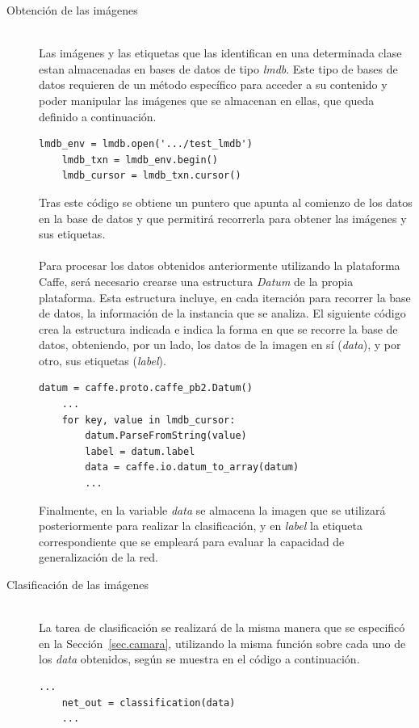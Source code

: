 \begin{description}
	\item[Obtención de las imágenes] \hfill 
	\vspace{5pt}
	\\
	Las imágenes y las etiquetas que las identifican en una determinada clase estan almacenadas en bases de datos de tipo \textit{\acrfull{lmdb}}. Este tipo de bases de datos requieren de un método específico para acceder a su contenido y poder manipular las imágenes que se almacenan en ellas, que queda definido a continuación.
	\vspace{10pt}
	\begin{lstlisting}[frame=single]
	lmdb_env = lmdb.open('.../test_lmdb')
	lmdb_txn = lmdb_env.begin()
	lmdb_cursor = lmdb_txn.cursor()
	\end{lstlisting}
	
	Tras este código se obtiene un puntero que apunta al comienzo de los datos en la base de datos y que permitirá recorrerla para obtener las imágenes y sus etiquetas.\\
	\vspace{-10pt}
	\\
	Para procesar los datos obtenidos anteriormente utilizando la plataforma Caffe, será necesario crearse una estructura \textit{Datum} de la propia plataforma. Esta estructura incluye, en cada iteración para recorrer la base de datos, la información de la instancia que se analiza. El siguiente código crea la estructura indicada e indica la forma en que se recorre la base de datos, obteniendo, por un lado, los datos de la imagen en sí (\textit{data}), y por otro, sus etiquetas (\textit{label}).
	\vspace{10pt}
	\begin{lstlisting}[frame=single]
	datum = caffe.proto.caffe_pb2.Datum()
	...
	for key, value in lmdb_cursor:
		datum.ParseFromString(value)
		label = datum.label
		data = caffe.io.datum_to_array(datum)
		...
	\end{lstlisting}
	
	Finalmente, en la variable \textit{data} se almacena la imagen que se utilizará posteriormente para realizar la clasificación, y en \textit{label} la etiqueta correspondiente que se empleará para evaluar la capacidad de generalización de la red.
	\vspace{5pt}
	\item[Clasificación de las imágenes] \hfill 
	\vspace{5pt}
	\\
	La tarea de clasificación se realizará de la misma manera que se especificó en la Sección~\ref{sec.camara}, utilizando la misma función sobre cada uno de los \textit{data} obtenidos, según se muestra en el código a continuación.
	\vspace{25pt}
	\begin{lstlisting}[frame=single]
	...
	net_out = classification(data)
	...
	\end{lstlisting}
	

\end{description}
